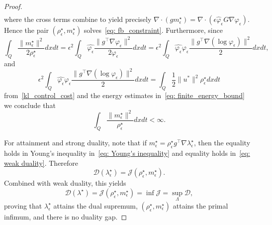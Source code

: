\documentclass{amsart}
\numberwithin{equation}{section}
\begin{document}
\begin{proof}
\begin{align*}
\end{align*}
where the cross terms combine to yield precisely $\nabla\cdot(gm_{\epsilon}^\star) = \nabla\cdot(\epsilon\hat\varphi_{\epsilon} G\nabla\varphi_{\epsilon})$. Hence the pair $(\rho_{\epsilon}^\star,m_{\epsilon}^\star)$ solves~\eqref{eq: fb_constraint}. Furthermore, since
\[
\int_Q \frac{\|m_{\epsilon}^\star\|^2}{2\rho_{\epsilon}^\star} dxdt = \epsilon^2 \int_Q \hat{\varphi_{\epsilon}} \frac{\|g^\top \nabla\varphi_{\epsilon}\|^2}{2\varphi_{\epsilon}} dxdt= \epsilon^2\int_Q \hat{\varphi_{\epsilon}}  \varphi_{\epsilon} \frac{\|g^\top \nabla(\log\varphi_{\epsilon})\|^2}{2}   dxdt,
\]
and
\[
\epsilon^2\int_Q \hat{\varphi_{\epsilon}}   \varphi_{\epsilon}   \frac{\|g^\top \nabla(\log\varphi_{\epsilon})\|^2}{2}   dxdt=\int_Q  \frac12\|u^*\|^2\rho_{\epsilon}^\star   dxdt
\]
from~\eqref{kl_control_cost} and the energy estimates in~\eqref{eq: finite_energy_bound} we conclude that
\[
\int_Q \frac{\|m_{\epsilon}^\star\|^2}{\rho_{\epsilon}^\star} dxdt<\infty.
\]

For attainment and strong duality, note that if $m_{\epsilon}^\star=\rho_{\epsilon}^\star g^\top\nabla\lambda_{\epsilon}^\star$, then the equality holds in Young's inequality in~\eqref{eq: Young's inequality} and equality holds in~\eqref{eq: weak duality}. Therefore
\[
\mathcal D(\lambda_{\epsilon}^\star) = \mathcal J(\rho_{\epsilon}^\star,m_{\epsilon}^\star).
\]
Combined with weak duality, this yields
\[
\mathcal D(\lambda^\star) = \mathcal J(\rho_{\epsilon}^\star,m_{\epsilon}^\star) = \inf\mathcal J = \sup_{\Lambda}\mathcal D,
\]
proving that $\lambda_{\epsilon}^\star$ attains the dual supremum, $(\rho_{\epsilon}^\star,m_{\epsilon}^\star)$ attains the primal infimum, and there is no duality gap.


\end{proof}
\end{document}
